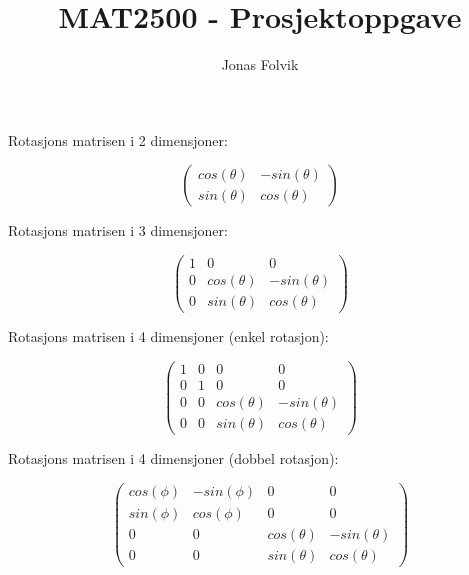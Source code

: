 \documentclass[a4paper,10pt,english]{article}
\title{MAT2500 - Prosjektoppgave}
\author{Jonas Folvik}
\begin{document}
    
    \maketitle
    
    Rotasjons matrisen i 2 dimensjoner:
    
    $$\left(
    \begin{matrix}
        cos(\theta) & -sin(\theta) \\
        sin(\theta) &  cos(\theta)
    \end{matrix}
    \right)$$

    Rotasjons matrisen i 3 dimensjoner:

    $$\left(
    \begin{matrix}
        1 & 0 & 0 \\
        0 & cos(\theta) & -sin(\theta) \\
        0 & sin(\theta) &  cos(\theta)
    \end{matrix}
    \right)$$

    Rotasjons matrisen i 4 dimensjoner (enkel rotasjon):

    $$\left(
    \begin{matrix}
        1 & 0 & 0 & 0 \\
        0 & 1 & 0 & 0 \\
        0 & 0 & cos(\theta) & -sin(\theta) \\
        0 & 0 & sin(\theta) &  cos(\theta)
    \end{matrix}
    \right)$$

    Rotasjons matrisen i 4 dimensjoner (dobbel rotasjon):

    $$\left(
    \begin{matrix}
        cos(\phi) & -sin(\phi) & 0 & 0 \\
        sin(\phi) &  cos(\phi) & 0 & 0 \\
        0 & 0 & cos(\theta) & -sin(\theta) \\
        0 & 0 & sin(\theta) &  cos(\theta)
    \end{matrix}
    \right)$$
\end{document}
